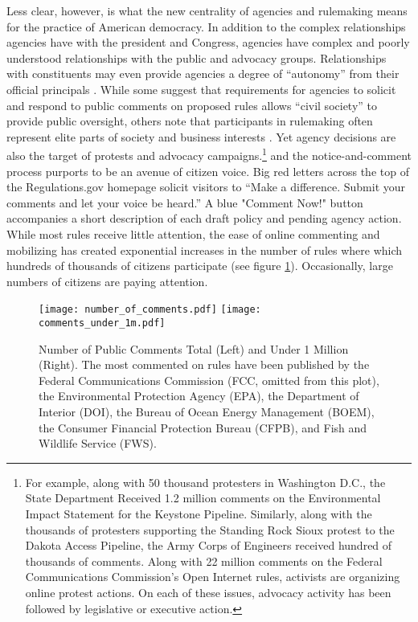 Less clear, however, is what the new centrality of agencies and rulemaking means for the practice of American democracy. In addition to the complex relationships agencies have with the president and Congress, agencies have complex and poorly understood relationships with the public and advocacy groups. Relationships with constituents may even provide agencies a degree of ``autonomy'' from their official principals \citep{Carpenter2001}. While some suggest that requirements for agencies to solicit and respond to public comments on proposed rules allows ``civil society'' to provide public oversight, others note that participants in rulemaking often represent elite parts of society \citep{Seifter2016ComplementaryPower} and business interests \citep{Yackee2006a}. Yet agency decisions are also the target of protests and advocacy campaigns.\footnote{For example, along with 50 thousand protesters in Washington D.C., the State Department Received 1.2 million comments on the Environmental Impact Statement for the Keystone Pipeline. Similarly, along with the thousands of protesters supporting the Standing Rock Sioux protest to the Dakota Access Pipeline, the Army Corps of Engineers received hundred of thousands of comments. Along with 22 million comments on the Federal Communications Commission's Open Internet rules, activists are organizing online protest actions. On each of these issues, advocacy activity has been followed by legislative or executive action.} and the notice-and-comment process purports to be an avenue of citizen voice. Big red letters across the top of the Regulations.gov homepage solicit visitors to ``Make a difference. Submit your comments and let your voice be heard.'' A blue "Comment Now!" button accompanies a short description of each draft policy and pending agency action. While most rules receive little attention, the ease of online commenting and mobilizing has created exponential increases in the number of rules where which hundreds of thousands of citizens participate (see figure \ref{fig:comments}). Occasionally, large numbers of citizens are paying attention.

\begin{figure}[!hb]
\caption{Number of Public Comments Total (Left) and Under 1 Million (Right). The most commented on rules have been published by the Federal Communications Commission (FCC, omitted from this plot), the Environmental Protection Agency (EPA), the Department of Interior (DOI), the Bureau of Ocean Energy Management (BOEM), the Consumer Financial Protection Bureau (CFPB), and Fish and Wildlife Service (FWS).}
\texttt{[image: number\_of\_comments.pdf]}
\texttt{[image: comments\_under\_1m.pdf]}
\label{fig:comments}
\end{figure}

